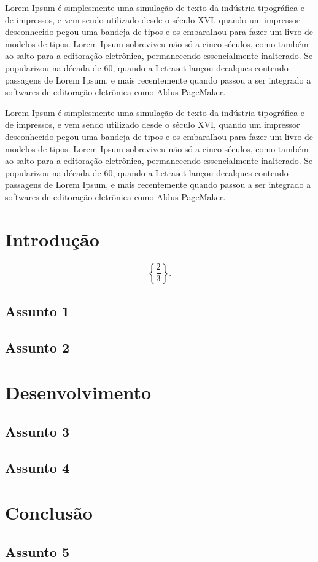 \documentclass[12pt, a4paper, oneside]{book}
\begin{document}
Lorem Ipsum é simplesmente uma simulação de texto da indústria tipográfica e de impressos, e vem sendo utilizado desde o século XVI, quando um impressor desconhecido pegou uma bandeja de tipos e os embaralhou para fazer um livro de modelos de tipos. Lorem Ipsum sobreviveu não só a cinco séculos, como também ao salto para a editoração eletrônica, permanecendo essencialmente inalterado. Se popularizou na década de 60, quando a Letraset lançou decalques contendo passagens de Lorem Ipsum, e mais recentemente quando passou a ser integrado a softwares de editoração eletrônica como Aldus PageMaker.

Lorem Ipsum é simplesmente uma simulação de texto da indústria tipográfica e de impressos, e vem sendo utilizado desde o século XVI, quando um impressor desconhecido pegou uma bandeja de tipos e os embaralhou para fazer um livro de modelos de tipos. Lorem Ipsum sobreviveu não só a cinco séculos, como também ao salto para a editoração eletrônica, permanecendo essencialmente inalterado. Se popularizou na década de 60, quando a Letraset lançou decalques contendo passagens de Lorem Ipsum, e mais recentemente quando passou a ser integrado a softwares de editoração eletrônica como Aldus PageMaker.

\chapter{Introdução}

\begin{equation}
\left\lbrace \frac{2}{3}\right\rbrace .
\end{equation}

\section{Assunto 1}
\section{Assunto 2}
\chapter{Desenvolvimento}
\section{Assunto 3}
\section{Assunto 4}
\chapter{Conclusão}
\section{Assunto 5}
\end{document}
